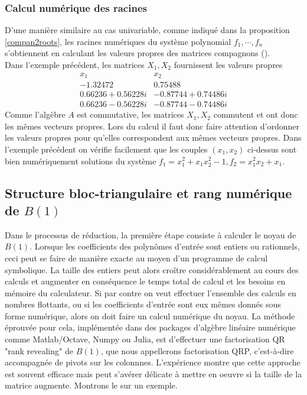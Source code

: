 \documentclass{article}
\theoremstyle{plain}%
\theoremstyle{definition}
\theoremstyle{remark}
\begin{document}
\subsubsection{Calcul numérique des racines}
D'une manière similaire au cas univariable, comme indiqué dans la proposition \ref{compan2roots}, les racines numériques du système polynomial $f_1, \cdots, f_n$ s'obtiennent en calculant les valeurs propres des matrices compagnons (\cite{AS}).\\
Dans l'exemple précédent, les matrices $X_1, X_2$ fournissent les valeurs propres
$$
\begin{array}{c|c}
	x_1 & x_2 \\
	\hline
	-1.32472  & 0.75488 \\
	0.66236 + 0.56228i & -0.87744 + 0.74486i \\
	0.66236 - 0.56228i & -0.87744 - 0.74486i
\end{array}
$$
Comme l'algèbre $A$ est commutative, les matrices $X_1, X_2$ commutent et ont donc les mêmes vecteurs propres. Lors du calcul il faut donc faire attention d'ordonner les valeurs propres pour qu'elles correspondent aux mêmes vecteurs propres.
Dans l'exemple précédent on vérifie facilement que les couples $(x_1, x_2)$ ci-dessus sont bien numériquement solutions du système $f_1 = x_1^2 + x_1x_2^2 - 1, f_2 = x_1^2x_2 + x_1$.

\subsection{Structure bloc-triangulaire et rang numérique de $B(1)$}
Dans le processus de réduction, la première étape consiste à calculer le noyau de $B(1)$. Lorsque les coefficients des polynômes d'entrée sont entiers ou rationnels, ceci peut se faire de manière exacte au moyen d'un programme de calcul symbolique. La taille des entiers peut alors croître considérablement au cours des calculs et augmenter en conséquence le temps total de calcul et les besoins en mémoire du calculateur. Si par contre on veut effectuer l'ensemble des calculs en nombres flottants, ou si les coefficients d'entrée sont eux mêmes donnés sous forme numérique, alors on doit faire un calcul numérique du noyau.
La méthode éprouvée pour cela, implémentée dans des packages d'algèbre linéaire numérique comme Matlab/Octave, Numpy ou Julia, est d'effectuer une factorisation QR "rank revealing" de $B(1)$, que nous appellerons factorisation QRP, c'est-à-dire accompagnée de pivots sur les colonnnes. L'expérience montre que cette approche est souvent efficace mais peut s'avérer délicate à mettre en oeuvre si la taille de la matrice augmente. Montrons le sur un exemple.
\end{document}
